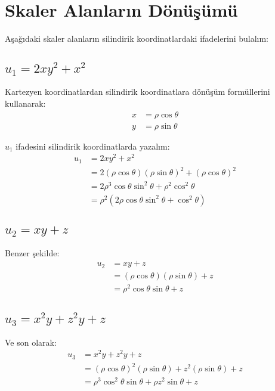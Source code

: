 \documentclass{fenbil}
\begin{document}
\section{Skaler Alanların Dönüşümü}

Aşağıdaki skaler alanların silindirik koordinatlardaki ifadelerini bulalım:

\subsection{$u_1 = 2xy^2 + x^2$}

Kartezyen koordinatlardan silindirik koordinatlara dönüşüm formüllerini kullanarak:
\begin{align}
x &= \rho\cos\theta \\
y &= \rho\sin\theta
\end{align}

$u_1$ ifadesini silindirik koordinatlarda yazalım:
\begin{align}
u_1 &= 2xy^2 + x^2 \\
&= 2(\rho\cos\theta)(\rho\sin\theta)^2 + (\rho\cos\theta)^2 \\
&= 2\rho^3\cos\theta\sin^2\theta + \rho^2\cos^2\theta \\
&= \rho^2(2\rho\cos\theta\sin^2\theta + \cos^2\theta)
\end{align}

\subsection{$u_2 = xy + z$}

Benzer şekilde:
\begin{align}
u_2 &= xy + z \\
&= (\rho\cos\theta)(\rho\sin\theta) + z \\
&= \rho^2\cos\theta\sin\theta + z
\end{align}

\subsection{$u_3 = x^2y + z^2y + z$}

Ve son olarak:
\begin{align}
u_3 &= x^2y + z^2y + z \\
&= (\rho\cos\theta)^2(\rho\sin\theta) + z^2(\rho\sin\theta) + z \\
&= \rho^3\cos^2\theta\sin\theta + \rho z^2\sin\theta + z
\end{align}
\end{document}

